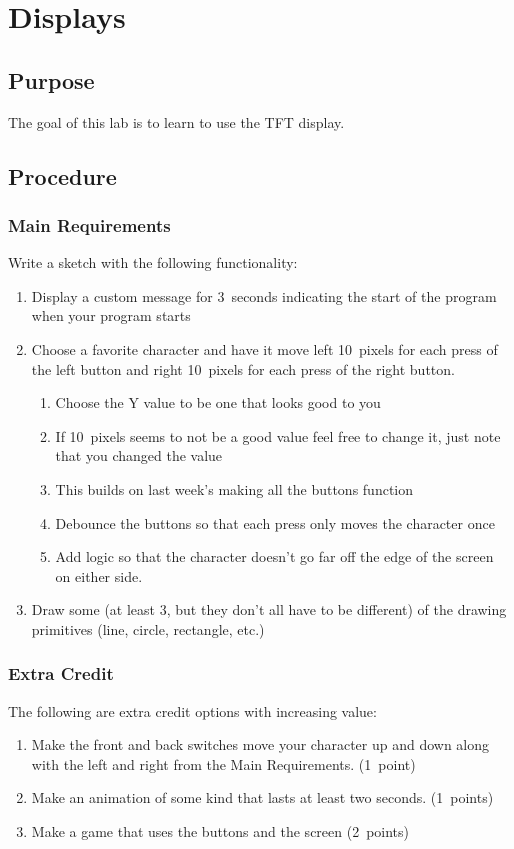 \chapter{Displays}

\section{Purpose}
The goal of this lab is to learn to use the TFT display.

\section{Procedure}
\subsection{Main Requirements}
Write a sketch with the following functionality:
\begin{enumerate}
    \item Display a custom message for 3~seconds indicating the start of the program when
            your program starts 
    \item Choose a favorite character and have it move left 10~pixels for each press
            of the left button and right 10~pixels for each press of the right button.
    \begin{enumerate}
        \item Choose the Y value to be one that looks good to you
        \item If 10~pixels seems to not be a good value feel free to change it, just note
                that you changed the value
        \item This builds on last week's making all the buttons function
        \item Debounce the buttons so that each press only moves the character once
        \item Add logic so that the character doesn't go far off the edge of the screen
                on either side.
    \end{enumerate}
    \item Draw some (at least 3, but they don't all have to be different) of the 
            drawing primitives (line, circle, rectangle, etc.)
\end{enumerate}

\subsection{Extra Credit}
The following are extra credit options with increasing value:
\begin{enumerate}
    \item Make the front and back switches move your character up and down along 
            with the left and right from the Main Requirements. (1~point)
    \item Make an animation of some kind that lasts at least two seconds. (1~points)
    \item Make a game that uses the buttons and the screen (2~points)
\end{enumerate}

